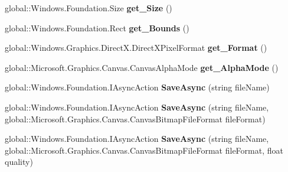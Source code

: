 \begin{DoxyCompactItemize}
\item 
\mbox{\label{interface_microsoft_1_1_graphics_1_1_canvas_1_1_i_canvas_bitmap_a0402608b6a37f8002b6fcc5ef95b8003}} 
global\+::\+Windows.\+Foundation.\+Size {\bfseries get\+\_\+\+Size} ()
\item 
\mbox{\label{interface_microsoft_1_1_graphics_1_1_canvas_1_1_i_canvas_bitmap_a9525b7941b7474c214ceda939e8a1f59}} 
global\+::\+Windows.\+Foundation.\+Rect {\bfseries get\+\_\+\+Bounds} ()
\item 
\mbox{\label{interface_microsoft_1_1_graphics_1_1_canvas_1_1_i_canvas_bitmap_a22ceb272a871aee9ccb6f36129c8cb25}} 
global\+::\+Windows.\+Graphics.\+Direct\+X.\+Direct\+X\+Pixel\+Format {\bfseries get\+\_\+\+Format} ()
\item 
\mbox{\label{interface_microsoft_1_1_graphics_1_1_canvas_1_1_i_canvas_bitmap_ab31c90d55255a3b262b19e7af008fb29}} 
global\+::\+Microsoft.\+Graphics.\+Canvas.\+Canvas\+Alpha\+Mode {\bfseries get\+\_\+\+Alpha\+Mode} ()
\item 
\mbox{\label{interface_microsoft_1_1_graphics_1_1_canvas_1_1_i_canvas_bitmap_ac4992fe87b3aa1e80423da03fcea6acf}} 
global\+::\+Windows.\+Foundation.\+I\+Async\+Action {\bfseries Save\+Async} (string file\+Name)
\item 
\mbox{\label{interface_microsoft_1_1_graphics_1_1_canvas_1_1_i_canvas_bitmap_aca107d6a479f4ea4b88f2265a278dedc}} 
global\+::\+Windows.\+Foundation.\+I\+Async\+Action {\bfseries Save\+Async} (string file\+Name, global\+::\+Microsoft.\+Graphics.\+Canvas.\+Canvas\+Bitmap\+File\+Format file\+Format)
\item 
\mbox{\label{interface_microsoft_1_1_graphics_1_1_canvas_1_1_i_canvas_bitmap_aa1b618fcc1333742a9cd060b9c7fdae5}} 
global\+::\+Windows.\+Foundation.\+I\+Async\+Action {\bfseries Save\+Async} (string file\+Name, global\+::\+Microsoft.\+Graphics.\+Canvas.\+Canvas\+Bitmap\+File\+Format file\+Format, float quality)

\end{DoxyCompactItemize}
